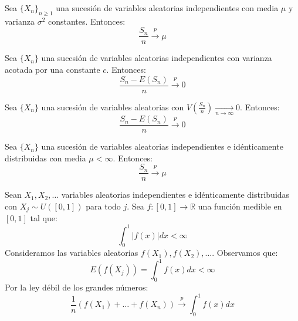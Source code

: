 \begin{theorem}[Chebyshev]
    Sea $\{X_n\}_{n \geq 1}$ una sucesión de variables aleatorias independientes con media $\mu$ y varianza $\sigma^2$ constantes.
    Entonces:
    $$\frac{S_n}{n} \xrightarrow{p} \mu$$
\end{theorem}

\begin{theorem}[Chebyshev]
    Sea $\{X_n\}$ una sucesión de variables aleatorias independientes con varianza acotada por una constante $c$.
    Entonces:
    $$\frac{S_n - E(S_n)}{n} \xrightarrow{p} 0$$
\end{theorem}

\begin{theorem}[Márkov]
    Sea $\{X_n\}$ una sucesión de variables aleatorias con $V\left(\frac{S_n}{n}\right) \xrightarrow[n \to \infty]{} 0$.
    Entonces:
    $$\frac{S_n - E(S_n)}{n} \xrightarrow{p} 0$$
\end{theorem}

\begin{theorem}[Khinchin]
    Sea $\{X_n\}$ una sucesión de variables aleatorias independientes e idénticamente distribuidas con media $\mu < \infty$.
    Entonces:
    $$\frac{S_n}{n} \xrightarrow{p} \mu$$
\end{theorem}

\begin{example}
    Sean $X_1, X_2, \dots$ variables aleatorias independientes e idénticamente distribuidas con $X_j \sim U([0, 1])$ para todo $j$.
    Sea $f: [0, 1] \to \mathbb{R}$ una función medible en $[0, 1]$ tal que:
    $$\int_0^1 |f(x)|dx < \infty$$
    Consideramos las variables aleatorias $f(X_1), f(X_2), \dots$.
    Observamos que:
    $$E(f(X_j)) = \int_0^1 f(x)dx < \infty$$
    Por la ley débil de los grandes números:
    $$\frac{1}{n}(f(X_1) + \dots + f(X_n)) \xrightarrow{p} \int_0^1 f(x)dx$$
\end{example}


